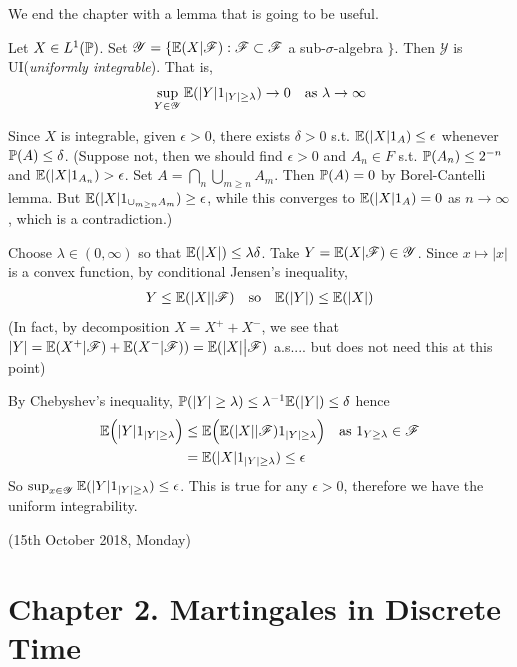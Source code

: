\documentclass[12pt,a4paper]{report}
\newenvironment{proof}
{\begin{changemargin}{1cm}{0.5cm} 
	}%
	{\end{changemargin}
}
\begin{document}
We end the chapter with a lemma that is going to be useful.
\s

 Let $X\in L^1(\mathbb{P})$. Set $\mathcal{Y} = \{\mathbb{E}(X|\mathscr{F}) : \mathscr{F} \subset \mathscr{F}$ a sub-$\sigma$-algebra $\}$. Then $\mathcal{Y}$ is UI(\emph{uniformly integrable}). That is,
\begin{align*}
\sup_{Y \in \mathcal{Y}} \mathbb{E}(|Y| 1_{|Y|\geq \lambda}) \rightarrow 0 \quad \text{as } \lambda \rightarrow \infty
\end{align*}
\begin{proof}
\pf Since $X$ is integrable, given $\epsilon >0$, there exists $\delta>0$ s.t. $\mathbb{E}(|X| 1_A) \leq \epsilon$ whenever $\mathbb{P}(A) \leq \delta$. (Suppose not, then we should find $\epsilon>0$ and $A_n \in F$ s.t. $\mathbb{P}(A_n) \leq 2^{-n}$ and $\mathbb{E}(|X|1_{A_n}) >\epsilon$. Set $A= \bigcap_n \bigcup_{m\geq n} A_m$. Then $\mathbb{P}(A) =0$ by Borel-Cantelli lemma. But $\mathbb{E}(|X| 1_{\cup_{m\geq n} A_m}) \geq \epsilon$, while this converges to $\mathbb{E}(|X|1_A) =0$ as $n\rightarrow \infty$, which is a contradiction.)

\quad Choose $\lambda \in (0,\infty)$ so that $\mathbb{E}(|X|) \leq \lambda \delta$. Take $Y = \mathbb{E}(X|\mathscr{F}) \in \mathcal{Y}$. Since $x\mapsto |x|$ is a convex function, by conditional Jensen's inequality,
\begin{align*}
Y \leq \mathbb{E}(|X| |\mathscr{F}) \quad \text{so} \quad \mathbb{E}(|Y|) \leq	\mathbb{E}(|X|)
\end{align*}
(In fact, by decomposition $X= X^+ + X^-$, we see that $|Y| = \mathbb{E}(X^+ | \mathscr{F}) + \mathbb{E}(X^-|\mathscr{F})) = \mathbb{E}(|X|\big| \mathscr{F})$ a.s.... but does not need this at this point)

By Chebyshev's inequality, $\mathbb{P}(|Y|\geq \lambda) \leq \lambda^{-1} \mathbb{E}(|Y|)\leq \delta$ hence
\begin{align*}
\mathbb{E}\Big( |Y| 1_{|Y|\geq \lambda} \Big) &\leq \mathbb{E}\Big( \mathbb{E}(|X||\mathscr{F}) 1_{|Y|\geq \lambda} \Big) \quad \text{as } 1_{Y\geq \lambda} \in \mathscr{F} \\
&= \mathbb{E}  (|X| 1_{|Y|\geq \lambda}) \leq \epsilon
\end{align*}
So $\sup_{x\in \mathcal{Y}} \mathbb{E}(|Y|1_{|Y|\geq \lambda}) \leq \epsilon$. This is true for any $\epsilon>0$, therefore we have the uniform integrability.

\eop
\end{proof}
\s

\newday

(15th October 2018, Monday)
\s

\section*{Chapter 2. Martingales in Discrete Time}
\end{document}
